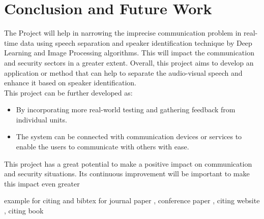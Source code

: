 \documentclass[12pt,a4paper]{report}
\begin{document}
\chapter{Conclusion and Future Work}
\cite{bashir2021subjective} \cite{mittal2016}
The Project will help in narrowing the imprecise communication problem in real-time data using 
speech separation and speaker identification technique by Deep Learning and Image Processing 
algorithms. This will impact the communication and security sectors in a greater extent. Overall, this 
project aims to develop an application or method that can help to separate the audio-visual speech and 
enhance it based on speaker identification.
\\
This project can be further developed as:
\begin{itemize}
    \item By incorporating more real-world testing and gathering feedback from individual units.
    \item  The system can be connected with communication devices or services to enable the users to communicate with others with ease.
\end{itemize}


\cite{Tea} This project has a great potential to make a positive impact on communication and security situations. Its continuous improvement will be important to make this impact 
even greater

example for citing and bibtex for journal paper \cite{croitoru2023diffusion}, conference paper \cite{mohamad2015smart}, citing website \cite{knuthwebsite}, citing book \cite{dirac}








\newpage

\pagestyle{plain}
\renewcommand{\bibname}{References}


\printbibliography
\end{document}
